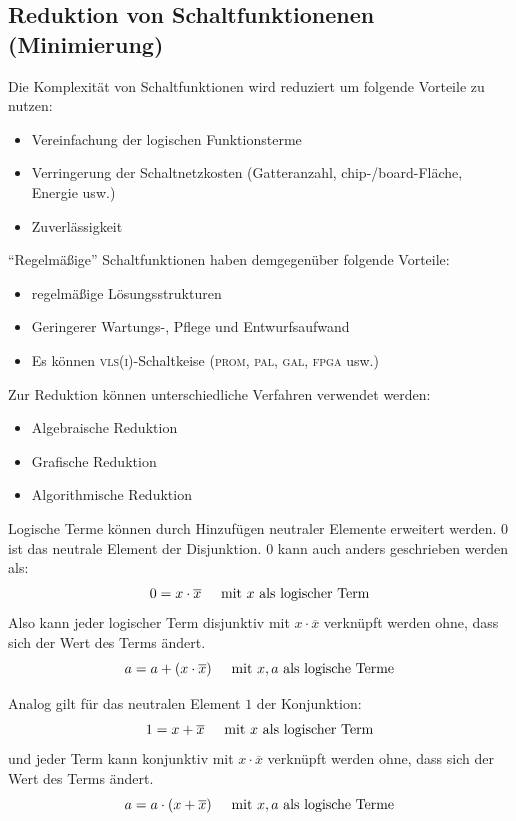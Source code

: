 \documentclass[11pt,a4paper]{scrreprt}
\begin{document}
\subsection{Reduktion von Schaltfunktionenen (Minimierung)}
Die Komplexität von Schaltfunktionen wird reduziert um folgende Vorteile zu nutzen:
\begin{itemize}
	\item
		Vereinfachung der logischen Funktionsterme
	\item
		Verringerung der Schaltnetzkosten (Gatteranzahl, chip-/board-Fläche, Energie usw.)
	\item
		Zuverlässigkeit
\end{itemize}
"`Regelmäßige"' Schaltfunktionen haben demgegenüber folgende Vorteile:
\begin{itemize}
  \item regelmäßige Lösungsstrukturen
  \item Geringerer Wartungs-, Pflege und Entwurfsaufwand
  \item Es können \textsc{vls(i)}-Schaltkeise (\textsc{prom}, \textsc{pal}, \textsc{gal}, \textsc{fpga} usw.)
\end{itemize}
Zur Reduktion können unterschiedliche Verfahren verwendet werden:
\begin{itemize}
  \item Algebraische Reduktion
  \item Grafische Reduktion
  \item Algorithmische Reduktion
\end{itemize}

Logische Terme können durch Hinzufügen neutraler Elemente erweitert werden. $0$ ist das neutrale Element der Disjunktion. $0$ kann auch anders geschrieben werden als: 
$$ 
	0 = x \cdot \overline{x} \hspace{5mm} \textnormal{mit } x \textnormal{ als logischer Term}
$$
Also kann jeder logischer Term disjunktiv mit $x \cdot \overline{x}$ verknüpft werden ohne, dass sich der Wert des Terms ändert.
$$ 
	a = a + (x \cdot \overline{x}) \hspace{5mm} \textnormal{mit } x, a \textnormal{ als logische Terme}
$$

Analog gilt für das neutralen Element $1$ der Konjunktion:
$$
	1 = x + \overline{x} \hspace{5mm} \textnormal{mit } x \textnormal{ als logischer Term}
$$
und jeder Term kann konjunktiv mit $x \cdot \overline{x}$ verknüpft werden ohne, dass sich der Wert des Terms ändert.
$$ 
	a = a \cdot (x + \overline{x}) \hspace{5mm} \textnormal{mit } x, a \textnormal{ als logische Terme}
$$
\end{document}
